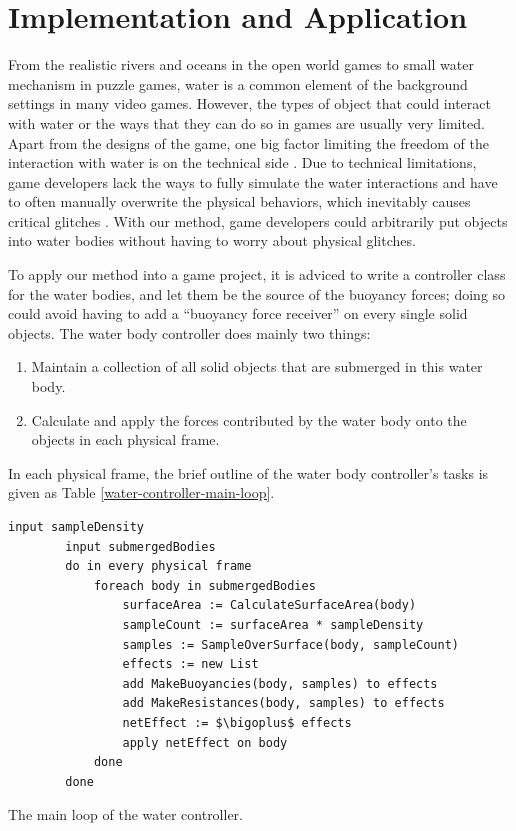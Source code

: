 \section{Implementation and Application}

From the realistic rivers and oceans in the open world games to small water mechanism in puzzle games,
water is a common element of the background settings in many video games.
However, the types of object that could interact with water or the ways that they can do so in games are usually very limited.
Apart from the designs of the game, one big factor limiting the freedom of the interaction with water is on the technical side \cite{kellomaki2012water}.
Due to technical limitations, game developers lack the ways to fully simulate the water interactions and have to often manually overwrite the physical behaviors, which inevitably causes critical glitches \cite{RedditAssassin}.
With our method, game developers could arbitrarily put objects into water bodies without having to worry about physical glitches.

To apply our method into a game project, it is adviced to write a controller class for the water bodies, and let them be the source of the buoyancy forces;
doing so could avoid having to add a ``buoyancy force receiver'' on every single solid objects.
The water body controller does mainly two things:
\begin{enumerate}
	\item Maintain a collection of all solid objects that are submerged in this water body.
	\item Calculate and apply the forces contributed by the water body onto the objects in each physical frame.
\end{enumerate}

In each physical frame, the brief outline of the water body controller's tasks is given as Table \ref{water-controller-main-loop}.

\begin{table}[htb]
	\centering
	\begin{lstlisting}[style=pseudo]
		input sampleDensity
		input submergedBodies
		do in every physical frame
			foreach body in submergedBodies
				surfaceArea := CalculateSurfaceArea(body)
				sampleCount := surfaceArea * sampleDensity
				samples := SampleOverSurface(body, sampleCount)
				effects := new List
				add MakeBuoyancies(body, samples) to effects
				add MakeResistances(body, samples) to effects
				netEffect := $\bigoplus$ effects
				apply netEffect on body
			done
		done
	\end{lstlisting}
	\caption{The main loop of the water controller.}
	\label{water-controller-main-loop}
\end{table}


